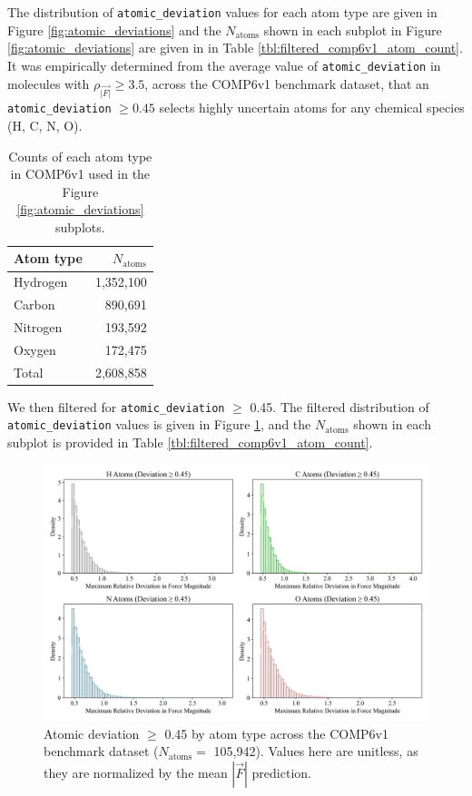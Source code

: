 The distribution of \verb|atomic_deviation| values for each atom type are given in Figure \ref{fig:atomic_deviations} and the $N_\text{atoms}$ shown in each subplot in Figure \ref{fig:atomic_deviations} are given in in Table \ref{tbl:filtered_comp6v1_atom_count}.
It was empirically determined from the average value of \verb|atomic_deviation| in molecules with $\rho_{\vec{|F|}} \geq 3.5$, across the COMP6v1 benchmark dataset, that an \verb|atomic_deviation| $\geq 0.45$ selects highly uncertain atoms for any chemical species (H, C, N, O).

\begin{table}[h!]
\centering
\caption[Counts of each atom type in COMP6v1]{
Counts of each atom type in COMP6v1 used in the Figure \ref{fig:atomic_deviations} subplots.
}\label{tbl:comp6v1_atom_count}
\begin{tabularx}{0.26\textwidth}{lr}  
\toprule
Atom type & $N_\text{atoms}$ \\
\midrule
Hydrogen & 1,352,100 \\
Carbon & 890,691 \\ 
Nitrogen & 193,592 \\ 
Oxygen & 172,475 \\ 
Total & 2,608,858 \\
\bottomrule
\end{tabularx}
\end{table}

We then filtered for \verb|atomic_deviation| $\geq$ 0.45.
The filtered distribution of \verb|atomic_deviation| values is given in Figure \ref{fig:filtered_atomic_deviations}, and the $N_\text{atoms}$ shown in each subplot is provided in Table \ref{tbl:filtered_comp6v1_atom_count}.

\begin{figure}[!hb]
    \centering
    \includegraphics[width=0.9\linewidth]{Images/2xr_forces/max_force_deviation_by_species_filtered.png
    }
    \caption[Atomic deviation $\geq$ 0.45 by atom type (COMP6v1)]{Atomic deviation $\geq$ 0.45 by atom type across the COMP6v1 benchmark dataset ($N_\text{atoms}=$ 105,942). Values here are unitless, as they are normalized by the mean $|\vec{F}|$ prediction.}
    \label{fig:filtered_atomic_deviations}
\end{figure}

